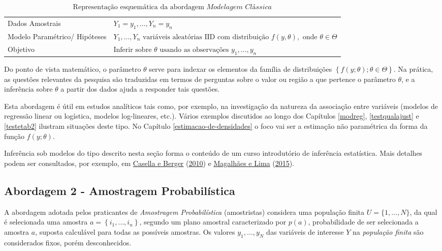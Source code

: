 \documentclass[
  12pt,
  brazilian,
]{book}
\theoremstyle{definition}
\theoremstyle{definition}
\theoremstyle{definition}
\theoremstyle{definition}
\theoremstyle{remark}
\begin{document}
\begin{table}[H]

\caption{\label{tab:modelclass}$\text{Representação esquemática da abordagem }\textit{Modelagem Clássica}$}
\centering
\begin{tabular}[t]{>{\raggedright\arraybackslash}p{4.5cm}l}
\toprule
Dados Amostrais & $Y_1=y_1,\ldots, Y_n=y_n$\\
Modelo Paramétrico/ Hipóteses & $Y_1, \ldots ,Y_n \text{ variáveis aleatórias IID com distribuição }f(y,\theta),\text{ onde }\theta \in \Theta$\\
Objetivo & $\text{Inferir sobre }\theta\text{ usando as observações } y_1, \ldots ,y_n$\\
\bottomrule
\end{tabular}
\end{table}

Do ponto de vista matemático, o parâmetro \(\theta\) serve para indexar os
elementos da família de distribuições
\(\left\{f\left( y;\theta \right);\theta \in \Theta \right\}\). Na prática, as
questões relevantes da pesquisa são traduzidas em termos de perguntas sobre o
valor ou região a que pertence o parâmetro \(\theta\), e a inferência sobre
\(\theta\) a partir dos dados ajuda a responder tais questões.

Esta abordagem é útil em estudos analíticos tais como, por exemplo, na
investigação da natureza da associação entre variáveis (modelos de regressão
linear ou logística, modelos log-lineares, etc.). Vários exemplos discutidos ao
longo dos Capítulos \ref{modreg}, \ref{testqualajust} e \ref{testetab2}
ilustram situações deste tipo. No Capítulo \ref{estimacao-de-densidades} o foco
vai ser a estimação não paramétrica da forma da função \(f(y;\theta)\).

Inferência sob modelos do tipo descrito nesta seção forma o conteúdo de um curso
introdutório de inferência estatística. Mais detalhes podem ser consultados, por
exemplo, em \protect\hyperlink{ref-Casella}{Casella e Berger} (\protect\hyperlink{ref-Casella}{2010}) e \protect\hyperlink{ref-Marcos}{Magalhães e Lima} (\protect\hyperlink{ref-Marcos}{2015}).

\hypertarget{abordagem-2---amostragem-probabiluxedstica}{%
\subsection{Abordagem 2 - Amostragem Probabilística}\label{abordagem-2---amostragem-probabiluxedstica}}

A abordagem adotada pelos praticantes de \emph{Amostragem Probabilística}
(amostristas) considera uma população finita \(U=\{1, \ldots ,N\}\), da qual é
selecionada uma amostra \(a=\left\{ i_{1}, \ldots ,i_{n}\right\}\), segundo um
plano amostral caracterizado por \(p\left( a\right)\), probabilidade de ser
selecionada a amostra \(a\), suposta calculável para todas as possíveis amostras.
Os valores \(y_{1}, \ldots ,y_{N}\) das variáveis de interesse \(Y\) na \emph{população
finita} são considerados fixos, porém desconhecidos.
\end{document}
